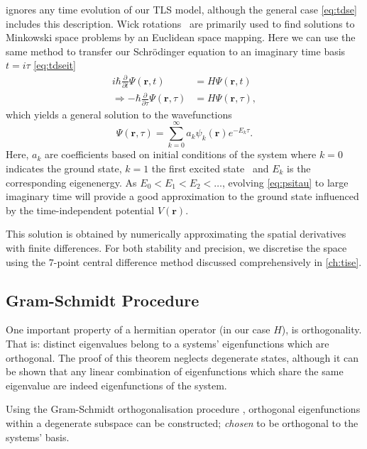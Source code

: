  ignores any time evolution of our TLS model, although the general case \cref{eq:tdse} includes this description.
Wick rotations~\cite{Wick1954} are primarily used to find solutions to Minkowski space problems by an Euclidean space mapping.
Here we can use the same method to transfer our Schr\"{o}dinger equation to an imaginary time basis $t=i\tau$ \cref{eq:tdseit}
\begin{align}
i \hbar \frac{\partial}{\partial t}\Psi(\mathbf{r},t) &= H\Psi(\mathbf{r},t)\label{eq:tdse}\\
\Rightarrow - \hbar \frac{\partial}{\partial \tau}\Psi(\mathbf{r},\tau) &= H\Psi(\mathbf{r},\tau),\label{eq:tdseit}
\end{align}
which yields a general solution to the wavefunctions
\begin{equation}
\Psi(\mathbf{r},\tau) = \sum_{k=0}^\infty a_k\psi_k(\mathbf{r})e^{-E_k \tau}.\label{eq:psitau}
\end{equation}
Here, ${a_k}$ are coefficients based on initial conditions of the system where $k=0$ indicates the ground state, $k=1$ the first excited state \etc\ and $E_k$ is the corresponding eigenenergy.
As $E_0 < E_1 < E_2 < \ldots$, evolving \cref{eq:psitau} to large imaginary time will provide a good approximation to the ground state influenced by the time-independent potential $V(\mathbf{r})$.

This solution is obtained by numerically approximating the spatial derivatives with finite differences.
For both stability and precision, we discretise the space using the $7$-point central difference method discussed comprehensively in \cref{ch:tise}.

\subsection{Gram-Schmidt Procedure}\label{sec:gsp}

One important property of a hermitian operator (in our case $H$), is orthogonality. That is: distinct eigenvalues belong to a systems' eigenfunctions which are orthogonal.
The proof of this theorem neglects degenerate states, although it can be shown that any linear combination of eigenfunctions which share the same eigenvalue are indeed eigenfunctions of the system.

Using the Gram-Schmidt orthogonalisation procedure \cite{Gram1883, Schmidt1907}, orthogonal eigenfunctions within a degenerate subspace can be constructed; \textit{chosen} to be orthogonal to the systems' basis.

